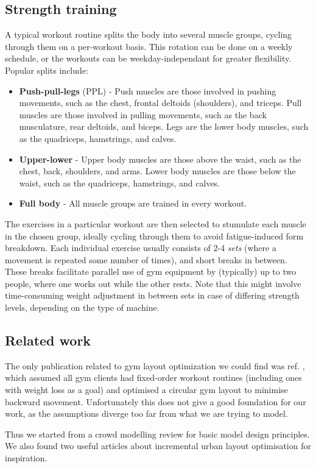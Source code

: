 \documentclass[9pt]{pnas-new}
\begin{document}
\subsection*{Strength training}
A typical workout routine splits the body into several muscle groups, cycling through them on a per-workout basis. This rotation can be done on a weekly schedule, or the workouts can be weekday-independant for greater flexibility. Popular splits include:
\begin{itemize}
	\item \textbf{Push-pull-legs} (PPL) - Push muscles are those involved in pushing movements,
	such as the chest, frontal deltoids (shoulders), and triceps. Pull muscles are those involved in pulling movements, such as the back musculature, rear deltoids, and biceps. Legs are the lower body muscles, such as the quadriceps, hamstrings, and calves.
	\item \textbf{Upper-lower} - Upper body muscles are those above the waist, such as the chest, back, shoulders, and arms. Lower body muscles are those below the waist, such as the quadriceps, hamstrings, and calves.
	\item \textbf{Full body} - All muscle groups are trained in every workout.
\end{itemize}
The exercises in a particular workout are then selected to stumulate each muscle in the chosen group, ideally cycling through them to avoid fatigue-induced form breakdown. Each individual exercise usually consists of 2-4 {\it sets} (where a movement is repeated some number of times), and short breaks in between. These breaks facilitate parallel use of gym equipment by (typically) up to two people, where one works out while the other rests. Note that this might involve time-consuming weight adjustment in between sets in case of differing strength levels, depending on the type of machine.


\subsection*{Related work}
The only publication related to gym layout optimization we could find was ref. \cite{turcine2022gym}, which assumed all gym clients had fixed-order workout routines (including ones with weight loss as a goal) and optimised a circular gym layout to minimise backward movement. Unfortunately this does not give a good foundation for our work, as the assumptions diverge too far from what we are trying to model.

Thus we started from a crowd modelling review \cite{yang2020crowd_modelling_review} for basic model design principles. We also found two useful articles about incremental urban layout optimisation \cite{feng2016crowd_drive_layout_design, mathew2019urban_walkability} for inspiration.
\end{document}
